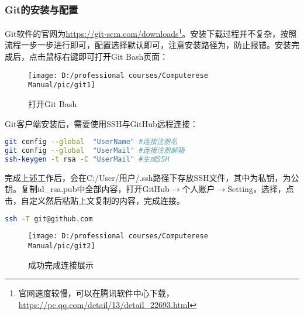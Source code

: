 \documentclass[cn, twoside]{myModel}
\begin{document}
		\subsubsection{Git的安装与配置}
			\par{}Git软件的官网为\url{https://git-scm.com/downloads}\footnote[1]{官网速度较慢，可以在腾讯软件中心下载，\url{https://pc.qq.com/detail/13/detail\_22693.html}}。安装下载过程并不复杂，按照流程一步一步进行即可，配置选择默认即可，注意安装路径为，防止报错。安装完成后，点击鼠标右键即可打开Git Bash页面：
			\begin{figure}[H]
				\centering
				\texttt{[image: D:/professional courses/Computerese Manual/pic/git1]}
				\caption{打开Git Bash}
				\label{pic2}
			\end{figure}
			\par{}Git客户端安装后，需要使用SSH与GitHub远程连接：
			\begin{lstlisting}[language=bash, numbers=none]
git config --global  "UserName" #连接注册名
git config --global  "UserMail" #连接注册邮箱
ssh-keygen -t rsa -C "UserMail" #生成SSH
			\end{lstlisting}
			完成上述工作后，会在C:/User/用户/.ssh路径下存放SSH文件，其中为私钥，为公钥。复制id\_rsa.pub中全部内容，打开GitHub$\rightarrow$个人账户$\rightarrow$Setting，选择，点击，自定义然后粘贴上文复制的内容，完成连接。
			\begin{lstlisting}[language=bash, numbers=none]
ssh -T git@github.com 
			\end{lstlisting}
			\begin{figure}[H]
				\centering
				\texttt{[image: D:/professional courses/Computerese Manual/pic/git2]}
				\caption{成功完成连接展示}
				\label{pic3}
			\end{figure}
\end{document}
